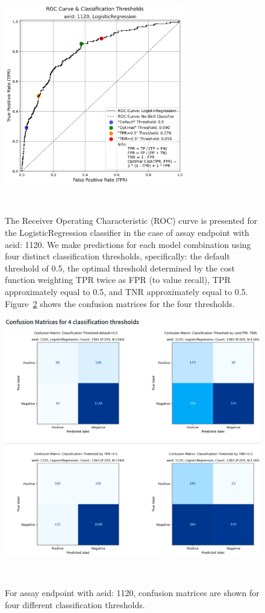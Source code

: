 \begin{figure}[h]
  \centering
  \includegraphics[width=0.7\textwidth]{figures/roc1120.png}
  \caption{The Receiver Operating Characteristic (ROC) curve is presented for the LogisticRegression classifier in the case of assay endpoint with aeid: 1120. We make predictions for each model combination using four distinct classification thresholds, specifically: the default threshold of 0.5, the optimal threshold determined by the cost function weighting TPR twice as FPR (to value recall), TPR approximately equal to 0.5, and TNR approximately equal to 0.5. Figure~\ref{fig:cm1120} shows the confusion matrices for the four thresholds.}
~\label{fig:roc1120}
\end{figure}

\begin{figure}[h]
  \centering
  \includegraphics[width=1.0\textwidth]{figures/cm1120.png}
  \caption{For assay endpoint with aeid: 1120, confusion matrices are shown for four different classification thresholds.}
~\label{fig:cm1120}
\end{figure}


